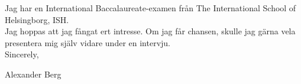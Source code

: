 \documentclass[../main.tex]{subfiles}
\begin{document}
Jag har en International Baccalaureate-examen från The International School of Helsingborg, ISH.
\\

Jag hoppas att jag fångat ert intresse. Om jag får chansen, skulle jag gärna vela presentera mig själv vidare under en intervju.
\\

Sincerely, 

Alexander Berg
\end{document}
